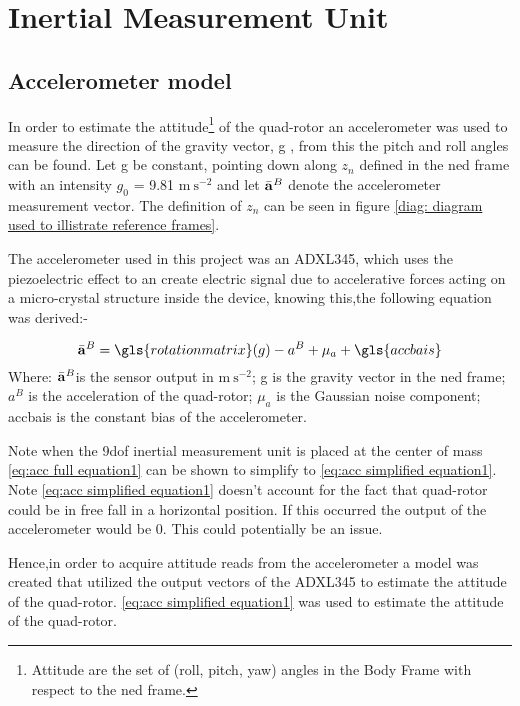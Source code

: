 \section{Inertial Measurement Unit} \label{sec:imu section for relation of stuff}
\subsection{Accelerometer model} \label{sec: acc model}
In order to estimate the attitude\footnote{Attitude are the set of (\gls{roll}, \gls{pitch}, \gls{yaw}) angles in the Body Frame with respect to the \gls{ned} frame.} of the quad-rotor an accelerometer was used to measure the direction of the gravity vector, g , from this the pitch and roll angles can be found. Let g be constant, pointing down along $z_n$ defined in the \gls{ned} frame with an intensity $g_0$ = 9.81 $\mathrm{m~s^{-2}}$ and let
$\bar{\bf a}^B$ denote the accelerometer measurement vector. The definition of $z_n$ can be seen in figure \ref{diag: diagram used to illistrate reference frames}. 

The accelerometer used in this project was an ADXL345, which uses the piezoelectric effect to an create electric signal due to accelerative forces acting on a micro-crystal structure inside the device, knowing this,the following equation was derived:-

\begin{equation}
	\bar{\bf a}^{B} = \gls{rotationmatrix}(g) - a^{B} +\mu_a+ \gls{accbais}  \label{eq:acc full equation1}
\end{equation}
Where: $\bar{\bf a}^{B}$is the sensor output in $\mathrm{m~s^{-2}}$;  g is the gravity vector in the \gls{ned} frame; $a^{B}$ is the acceleration of the quad-rotor; $\mu_a$ is the Gaussian noise component; \gls{accbais} is the constant bias of the accelerometer.


Note when the \gls{9dof} inertial measurement unit is placed at the center of mass \eqref{eq:acc full equation1} can  be shown to simplify to \eqref{eq:acc simplified equation1}. Note  \eqref{eq:acc simplified equation1} doesn't account for the fact that quad-rotor could be in free
fall in a horizontal position. If this occurred the output of the accelerometer would be 0. This could potentially be an issue.

Hence,in order to acquire attitude reads from the accelerometer a model was created that utilized the output vectors of the ADXL345 to estimate the attitude of the quad-rotor. \eqref{eq:acc simplified equation1} was used to estimate the attitude of the quad-rotor.


